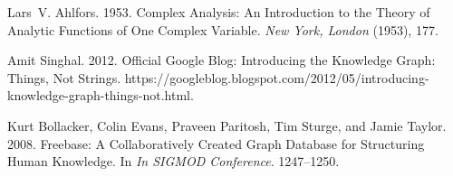 \documentclass[sigconf,edbt]{acmart-edbt2019}
\begin{document}



\begin{thebibliography}{36}



\ifx \showCODEN    \undefined {}     \fi
\ifx \showDOI      \undefined \def \showDOI       #1{#1}\fi
\ifx \showISBNx    \undefined \def \showISBNx     #1{\unskip}     \fi
\ifx \showISBNxiii \undefined \def \showISBNxiii  #1{\unskip}     \fi
\ifx \showISSN     \undefined \def \showISSN      #1{\unskip}     \fi
\ifx \showLCCN     \undefined \def \showLCCN      #1{\unskip}     \fi
\ifx \shownote     \undefined \def \shownote      #1{#1}          \fi
\ifx \showarticletitle \undefined \def \showarticletitle #1{#1}   \fi
\ifx \showURL      \undefined \def \showURL       {\relax}        \fi
\providecommand\bibfield[2]{#2}
\providecommand\bibinfo[2]{#2}
\providecommand\natexlab[1]{#1}
\providecommand\showeprint[2][]{arXiv:#2}

\bibfield{author}{\bibinfo{person}{Lars~V. Ahlfors}.}
  \bibinfo{year}{1953}\natexlab{}.
\newblock \showarticletitle{Complex Analysis: An Introduction to the Theory of
  Analytic Functions of One Complex Variable}.
\newblock \bibinfo{journal}{\emph{New York, London}} (\bibinfo{year}{1953}),
  \bibinfo{pages}{177}.
\newblock


\bibfield{author}{\bibinfo{person}{{Amit Singhal}}.}
  \bibinfo{year}{2012}\natexlab{}.
\newblock \bibinfo{title}{Official {{Google Blog}}: {{Introducing}} the
  {{Knowledge Graph}}: Things, Not Strings}.
\newblock
  \bibinfo{howpublished}{https://googleblog.blogspot.com/2012/05/introducing-knowledge-graph-things-not.html}.
\newblock


\bibfield{author}{\bibinfo{person}{Kurt Bollacker}, \bibinfo{person}{Colin
  Evans}, \bibinfo{person}{Praveen Paritosh}, \bibinfo{person}{Tim Sturge},
  {and} \bibinfo{person}{Jamie Taylor}.} \bibinfo{year}{2008}\natexlab{}.
\newblock \showarticletitle{Freebase: A Collaboratively Created Graph Database
  for Structuring Human Knowledge}. In \bibinfo{booktitle}{\emph{In {{SIGMOD
  Conference}}}}. \bibinfo{pages}{1247--1250}.
\newblock



\end{thebibliography}
\end{document}
